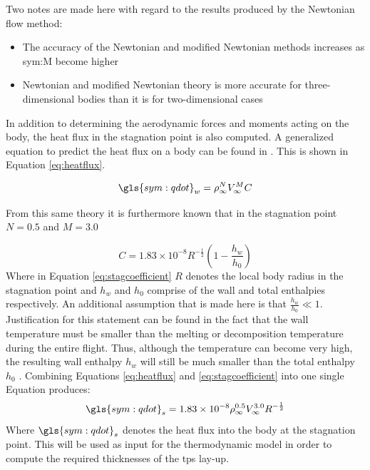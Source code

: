 Two notes are made here with regard to the results produced by the Newtonian flow method:
\begin{itemize}
	\item The accuracy of the Newtonian and modified Newtonian methods increases as \gls{sym:M} become higher \cite{AndersonJr.2007,Bertin1994}
	\item Newtonian and modified Newtonian theory is more accurate for three-dimensional bodies than it is for two-dimensional cases \cite{AndersonJr.2007}
\end{itemize}

In addition to determining the aerodynamic forces and moments acting on the body, the heat flux in the stagnation point is also computed. A generalized equation to predict the heat flux on a body can be found in \cite{AndersonJr.2006,Tauber1986}. This is shown in Equation \ref{eq:heatflux}.

\begin{equation}
\gls{sym:qdot}_w=\rho_{\infty}^{N}V_{\infty}^{M}C
\label{eq:heatflux}
\end{equation}

From this same theory it is furthermore known that in the stagnation point $N=0.5$ and $M=3.0$

\begin{equation}
\label{eq:stagcoefficient}
C=1.83 \times 10^{-8} R^{-\frac{1}{2}}\left(1-\frac{h_{w}}{h_{0}}\right)
\end{equation}
Where in Equation \ref{eq:stagcoefficient} $R$ denotes the local body radius in the stagnation point and $h_{w}$ and $h_{0}$ comprise of the wall and total enthalpies respectively. An additional assumption that is made here is that $\frac{h_{w}}{h_{0}}\ll 1$. Justification for this statement can be found in the fact that the wall temperature must be smaller than the melting or decomposition temperature during the entire flight. Thus, although the temperature can become very high, the resulting wall enthalpy $h_{w}$ will still be much smaller than the total enthalpy $h_{0}$ \cite[p.347]{AndersonJr.2006}. %
Combining Equations \ref{eq:heatflux} and \ref{eq:stagcoefficient} into one single Equation produces:
\begin{equation}
\gls{sym:qdot}_s=1.83 \times 10^{-8}\rho_{\infty}^{0.5} V_{\infty}^{3.0} R^{-\frac{1}{2}}
\label{eq:qstag}
\end{equation}
Where $\gls{sym:qdot}_s$ denotes the heat flux into the body at the stagnation point. This will be used as input for the thermodynamic model in order to compute the required thicknesses of the \acrfull{tps} lay-up.

